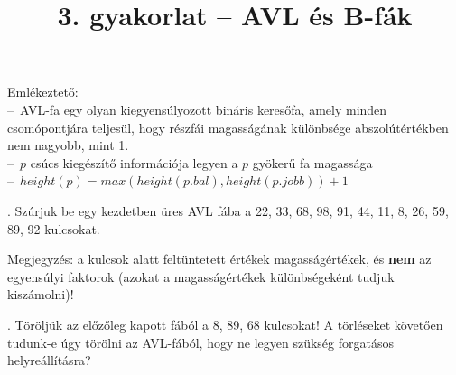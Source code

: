 \documentclass[12pt]{article}
\date{}
\title{3. gyakorlat -- AVL és B-fák}
\begin{document}
\maketitle

\noindent Emlékeztető:\\
--~AVL-fa egy olyan kiegyensúlyozott bináris keresőfa, amely minden 
csomópontjára teljesül, hogy részfái magasságának különbsége abszolútértékben 
nem nagyobb, mint 1.\\
--~$p$ csúcs kiegészítő információja legyen a $p$ gyökerű fa magassága\\
--~$height(p) = max(height(p.bal), height(p.jobb))+1$

\vspace{1.1em}

. Szúrjuk be egy kezdetben üres AVL fába a 22, 33, 68, 98, 91, 44, 11, 8, 26, 59, 89, 92 kulcsokat.

\begin{figure}[!h]
\centering
\end{figure}

Megjegyzés: a kulcsok alatt feltüntetett értékek magasságértékek, és 
\textbf{nem} az egyensúlyi faktorok (azokat a magasságértékek különbségeként 
tudjuk kiszámolni)!

. Töröljük az előzőleg kapott fából a 8, 89, 68 kulcsokat! A törléseket követően tudunk-e úgy törölni az AVL-fából, hogy ne legyen szükség forgatásos helyreállításra?
\end{document}
